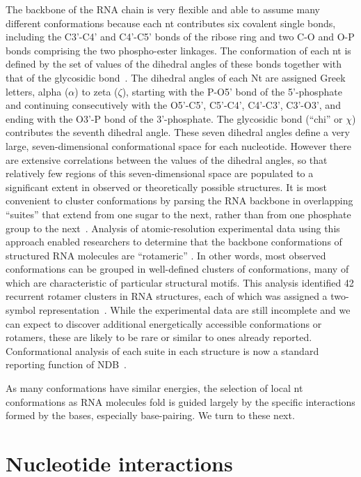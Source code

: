 The backbone of the RNA chain is very flexible and able to assume many different
conformations because each nt contributes six covalent single bonds, including
the C3'-C4' and C4'-C5' bonds of the ribose ring and two C-O and O-P bonds
comprising the two phospho-ester linkages. The conformation of each nt is
defined by the set of values of the dihedral angles of these bonds together with
that of the glycosidic bond~\cite{Neidle2008}. The dihedral angles of each Nt
are assigned Greek letters, alpha ($\alpha$) to zeta ($\zeta$), starting with
the P-O5' bond of the 5'-phosphate and continuing consecutively with the
O5'-C5', C5'-C4', C4'-C3', C3'-O3', and ending with the O3'-P bond of the
3'-phosphate. The glycosidic bond (``chi'' or $\chi$) contributes the seventh
dihedral angle. These seven dihedral angles define a very large,
seven-dimensional conformational space for each nucleotide. However there are
extensive correlations between the values of the dihedral angles, so that
relatively few regions of this seven-dimensional space are populated to a
significant extent in observed or theoretically possible structures. It is most
convenient to cluster conformations by parsing the RNA backbone in overlapping
``suites'' that extend from one sugar to the next, rather than from one
phosphate group to the next~\cite{Richardson2008}. Analysis of atomic-resolution
experimental data using this approach enabled researchers to determine that the
backbone conformations of structured RNA molecules are ``rotameric''
\cite{Murray2003}. In other words, most observed conformations can be grouped in
well-defined clusters of conformations, many of which are characteristic of
particular structural motifs. This analysis identified 42 recurrent rotamer
clusters in RNA structures, each of which was assigned a two-symbol
representation~\cite{Richardson2008}. While the experimental data are still
incomplete and we can expect to discover additional energetically accessible
conformations or rotamers, these are likely to be rare or similar to ones
already reported. Conformational analysis of each suite in each structure is now
a standard reporting function of NDB~\cite{CoimbatoreNarayanan2014}. 

As many conformations have similar energies, the selection of local nt
conformations as RNA molecules fold is guided largely by the specific
interactions formed by the bases, especially base-pairing. We turn to these
next. 

\section{Nucleotide interactions}

